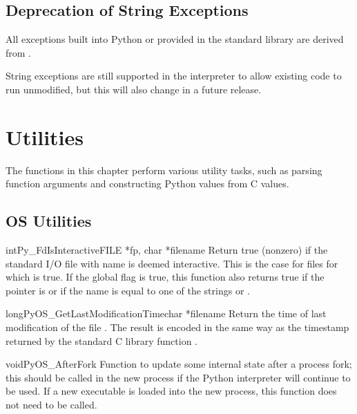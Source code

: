 \documentclass{manual}
\begin{document}
\section{Deprecation of String Exceptions}

All exceptions built into Python or provided in the standard library
are derived from .

String exceptions are still supported in the interpreter to allow
existing code to run unmodified, but this will also change in a future 
release.


\chapter{Utilities \label{utilities}}

The functions in this chapter perform various utility tasks, such as
parsing function arguments and constructing Python values from C
values.

\section{OS Utilities \label{os}}

\begin{cfuncdesc}{int}{Py_FdIsInteractive}{FILE *fp, char *filename}
Return true (nonzero) if the standard I/O file  with name
 is deemed interactive.  This is the case for files for
which  is true.  If the global flag
 is true, this function also returns true if
the  pointer is \NULL{} or if the name is equal to one of
the strings  or .
\end{cfuncdesc}

\begin{cfuncdesc}{long}{PyOS_GetLastModificationTime}{char *filename}
Return the time of last modification of the file .
The result is encoded in the same way as the timestamp returned by
the standard C library function .
\end{cfuncdesc}

\begin{cfuncdesc}{void}{PyOS_AfterFork}{}
Function to update some internal state after a process fork; this
should be called in the new process if the Python interpreter will
continue to be used.  If a new executable is loaded into the new
process, this function does not need to be called.
\end{cfuncdesc}
\end{document}
